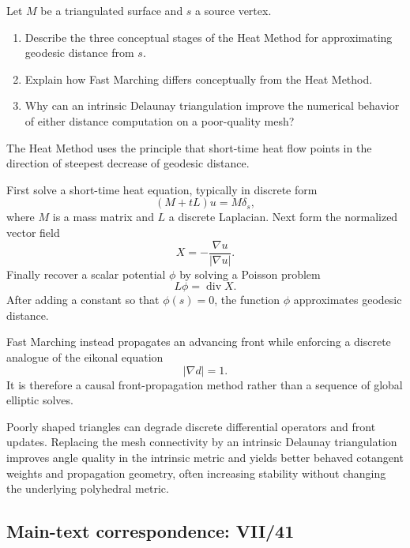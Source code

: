 \begin{problem}
\label{prob:cp-vii-0094}
Let \(M\) be a triangulated surface and \(s\) a source vertex.

\begin{enumerate}
\item Describe the three conceptual stages of the Heat Method for approximating
geodesic distance from \(s\).
\item Explain how Fast Marching differs conceptually from the Heat Method.
\item Why can an intrinsic Delaunay triangulation improve the numerical
behavior of either distance computation on a poor-quality mesh?
\end{enumerate}
\end{problem}

\begin{solution}
The Heat Method uses the principle that short-time heat flow points in the
direction of steepest decrease of geodesic distance.

First solve a short-time heat equation, typically in discrete form
\[
(M+tL)u=M\delta_s,
\]
where \(M\) is a mass matrix and \(L\) a discrete Laplacian.
Next form the normalized vector field
\[
X=-\frac{\nabla u}{|\nabla u|}.
\]
Finally recover a scalar potential \(\phi\) by solving a Poisson problem
\[
L\phi=\operatorname{div}X.
\]
After adding a constant so that \(\phi(s)=0\), the function \(\phi\)
approximates geodesic distance.

Fast Marching instead propagates an advancing front while enforcing a
discrete analogue of the eikonal equation
\[
|\nabla d|=1.
\]
It is therefore a causal front-propagation method rather than a sequence of
global elliptic solves.

Poorly shaped triangles can degrade discrete differential operators and front
updates.  Replacing the mesh connectivity by an intrinsic Delaunay
triangulation improves angle quality in the intrinsic metric and yields better
behaved cotangent weights and propagation geometry, often increasing stability
without changing the underlying polyhedral metric.
\end{solution}

\subsection*{Main-text correspondence: VII/41}

